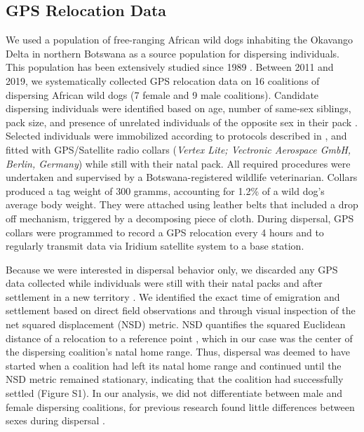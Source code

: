 \documentclass[abstract=on,10pt,a4paper,bibliography=totocnumbered]{article}
\begin{document}
\subsection{GPS Relocation Data}
We used a population of free-ranging African wild dogs inhabiting the Okavango
Delta in northern Botswana as a source population for dispersing individuals.
This population has been extensively studied since 1989 \citep{McNutt.1996,
Cozzi.2013, Cozzi.2020, Behr.2020}. Between 2011 and 2019, we systematically
collected GPS relocation data on 16 coalitions of dispersing African wild dogs
(7 female and 9 male coalitions). Candidate dispersing individuals were
identified based on age, number of same‐sex siblings, pack size, and presence of
unrelated individuals of the opposite sex in their pack \citep{McNutt.1996,
Behr.2020}. Selected individuals
were immobilized according to protocols described in \cite{Osofsky.1996}, and
fitted with GPS/Satellite radio collars (\textit{Vertex Lite; Vectronic
Aerospace GmbH, Berlin, Germany}) while still with their natal pack. All
required procedures were undertaken and supervised by a Botswana-registered
wildlife veterinarian. Collars produced a tag weight of 300 gramms, accounting
for 1.2\% of a wild dog's average body weight. They were attached using leather
belts that included a drop off mechanism, triggered by a decomposing piece of
cloth. During dispersal, GPS
collars were programmed to record a GPS relocation every 4 hours and to
regularly transmit data via Iridium satellite system to a base station.

Because we were interested in dispersal behavior only, we discarded any GPS data
collected while individuals were still with their natal packs and after
settlement in a new territory \citep{Cozzi.2020}. We identified the exact time
of emigration and settlement based on direct field observations and through
visual inspection of the net squared displacement (NSD) metric. NSD quantifies
the squared  Euclidean distance of a relocation to a
reference point \citep{Borger.2012}, which in our case was the center of the
dispersing coalition's natal home range. Thus, dispersal was deemed to have
started when a coalition had left its natal home range and continued until the
NSD metric remained stationary, indicating that the coalition had successfully
settled (Figure S1). In our analysis, we did not differentiate between male and
female dispersing coalitions, for previous research found little differences
between sexes during dispersal \citep{Woodroffe.2019, Cozzi.2020}.
\end{document}
